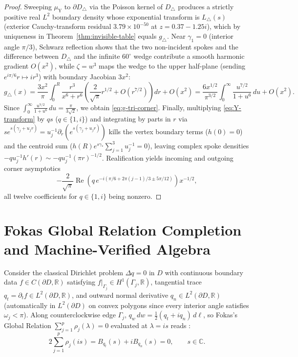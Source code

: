 \documentclass[11pt,reqno]{amsart}
\theoremstyle{definition}
\theoremstyle{remark}
\newcommand{\C}{\mathbb{C}}
\newcommand{\R}{\mathbb{R}}
\begin{document}
\begin{proof}
Sweeping $\mu_{\mathrm{Y}}$ to $\partial D_\triangle$ via the Poisson kernel of $D_\triangle$ produces a strictly positive real $L^2$ boundary density whose exponential transform is $L_\triangle(s)$ (exterior Cauchy-transform residual $3.79\times 10^{-50}$ at $z = 0.37 - 1.25i$), which by uniqueness in Theorem~\ref{thm:invisible-table} equals $g_\triangle$. Near $\gamma_1 = 0$ (interior angle $\pi/3$), Schwarz reflection shows that the two non-incident spokes and the difference between $D_\triangle$ and the infinite $60^\circ$ wedge contribute a smooth harmonic gradient $O(x^2)$, while $\zeta = w^3$ maps the wedge to the upper half-plane (sending $e^{i\pi/6}r \mapsto i r^3$) with boundary Jacobian $3x^2$:
\[
  g_\triangle(x) = \frac{3 x^2}{\pi} \int_0^R \frac{r^3}{x^6 + r^6}\left(\frac{2}{\sqrt\pi} r^{1/2} + O(r^{7/2})\right)dr + O(x^2)
  = \frac{6 x^{1/2}}{\pi^{3/2}} \int_0^\infty \frac{u^{7/2}}{1 + u^6}\,du + O(x^2).
\]
Since $\int_0^\infty \frac{u^{7/2}}{1 + u^6}\,du = \frac{\pi}{3\sqrt 2}$, we obtain \eqref{eq:g-tri-corner}. Finally, multiplying \eqref{eq:Y-transform} by $q s$ ($q \in \{1, i\}$) and integrating by parts in $r$ via $s e^{s(\gamma_j + u_j r)} = u_j^{-1}\partial_r(e^{s(\gamma_j + u_j r)})$ kills the vertex boundary terms ($h(0)=0$) and the centroid sum ($h(R)e^{s\gamma_*}\sum_{j=1}^3 u_j^{-1} = 0$), leaving complex spoke densities $-q u_j^{-1} h'(r) \sim -q u_j^{-1}(\pi r)^{-1/2}$. Realification yields incoming and outgoing corner asymptotics
\[
  -\frac{2}{\sqrt\pi}\operatorname{Re}\!\left(q\,e^{-i(\pi/6 + 2\pi(j-1)/3 \pm 5\pi/12)}\right) x^{-1/2},
\]
all twelve coefficients for $q \in \{1, i\}$ being nonzero.
\end{proof}

\section{Fokas Global Relation Completion and Machine-Verified Algebra}\label{sec:fokas}

Consider the classical Dirichlet problem $\Delta q = 0$ in $D$ with continuous boundary data $f \in C(\partial D, \R)$ satisfying $f|_{\Gamma_j} \in H^1(\Gamma_j, \R)$, tangential trace $q_t = \partial_t f \in L^2(\partial D, \R)$, and outward normal derivative $q_n \in L^2(\partial D, \R)$ (automatically in $L^2(\partial D)$ on convex polygons since every interior angle satisfies $\omega_j < \pi$). Along counterclockwise edge $\Gamma_j$, $q_w\,dw = \frac12(q_t + i q_n)\,d\ell$, so Fokas's Global Relation $\sum_{j=1}^p \rho_j(\lambda) = 0$ evaluated at $\lambda = i s$ reads \cite[\S 2]{Ashton2012}:
\begin{equation}\label{eq:gr-B}
  2 \sum_{j=1}^p \rho_j(i s) = B_{q_t}(s) + i B_{q_n}(s) = 0, \qquad s \in \C.
\end{equation}
\end{document}
